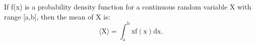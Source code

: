 If f(x) is a probability density function for a continuous random variable
X with range [a,b], then the mean of X is:
\[ \langle \mathrm{X} \rangle = \int _{\mathrm{a}} ^{\mathrm{b}}
\mathrm{xf(x)dx} . \]